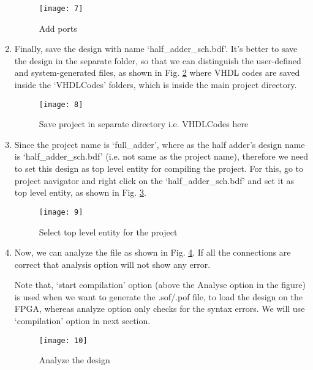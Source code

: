 \begin{enumerate}
	\begin{figure}
		\centering
		\texttt{[image: 7]}
		\caption{Add ports}
		\label{fig:make_connections}
	\end{figure}
	
	\item Finally, save the design with name `half\_adder\_sch.bdf'. It's better to save the design in the separate folder, so that we can distinguish the user-defined and system-generated files, as shown in Fig. \ref{fig:save_project} where VHDL codes are saved inside the `VHDLCodes' folders, which is inside the main project directory. 
	
	\begin{figure}
		\centering
		\texttt{[image: 8]}
		\caption{Save project in separate directory i.e. VHDLCodes here}
		\label{fig:save_project}
	\end{figure}
	
	\item Since the project name is `full\_adder', where as the half adder's design name is `half\_adder\_sch.bdf' (i.e. not same as the project name), therefore we need to set this design as top level entity for compiling the project. For this, go to project navigator and right click on the `half\_adder\_sch.bdf' and set it as top level entity, as shown in Fig. \ref{fig:top_level_project}.  
	
	\begin{figure}
		\centering
		\texttt{[image: 9]}
		\caption{Select top level entity for the project}
		\label{fig:top_level_project}
	\end{figure}
	
	\item Now, we can analyze the file as shown in Fig. \ref{fig:analyze_design}. If all the connections are correct that analysis option will not show any error. 
	
	Note that, `start compilation' option (above the Analyse option in the figure) is used when we want to generate the .sof/.pof file, to load the design on the FPGA, whereas analyze option only checks for the syntax errors. We will use `compilation' option in next section. 
	
	\begin{figure}
		\centering
		\texttt{[image: 10]}
		\caption{Analyze the design}
		\label{fig:analyze_design}
	\end{figure}
	
\end{enumerate}

